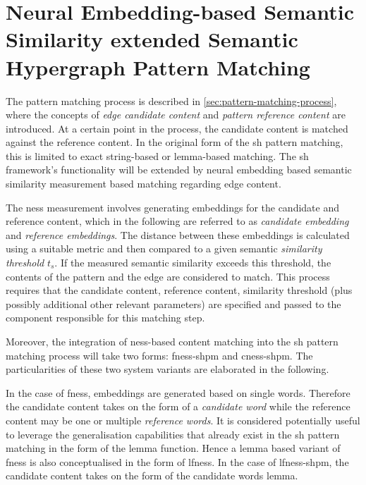 \documentclass[11pt, numbers=noenddot]{scrreprt}
\begin{document}
\section[Neural Embedding-based Semantic Similarity extended SH Pattern Matching]{Neural Embedding-based Semantic Similarity extended Semantic Hypergraph Pattern Matching}
The pattern matching process is described in \cref{sec:pattern-matching-process}, where the concepts of \textit{edge candidate content} and \textit{pattern reference content} are introduced. At a certain point in the process, the candidate content is matched against the reference content. In the original form of the \gls{sh} pattern matching, this is limited to exact string-based or lemma-based matching. The \gls{sh} framework's functionality will be extended by neural embedding based semantic similarity measurement based matching regarding edge content.

The \gls{ness} measurement involves generating embeddings for the candidate and reference content, which in the following are referred to as \textit{candidate embedding} and \textit{reference embeddings}. The distance between these embeddings is calculated using a suitable metric and then compared to a given semantic \textit{similarity threshold} \(t_s\). If the measured semantic similarity exceeds this threshold, the contents of the pattern and the edge are considered to match. This process requires that the candidate content, reference content, similarity threshold (plus possibly additional other relevant parameters) are specified and passed to the component responsible for this matching step.

Moreover, the integration of \gls{ness}-based content matching into the \gls{sh} pattern matching process will take two forms: \gls{fness-shpm} and \gls{cness-shpm}. The particularities of these two system variants are elaborated in the following.

In the case of \gls{fness}, embeddings are generated based on single words. Therefore the candidate content takes on the form of a \textit{candidate word} while the reference content may be one or multiple \textit{reference words}. It is considered potentially useful to leverage the generalisation capabilities that already exist in the \gls{sh} pattern matching in the form of the lemma function. Hence a lemma based variant of \gls{fness} is also conceptualised in the form of \gls{lfness}. In the case of \gls{lfness-shpm}, the candidate content takes on the form of the candidate words lemma.
\end{document}
